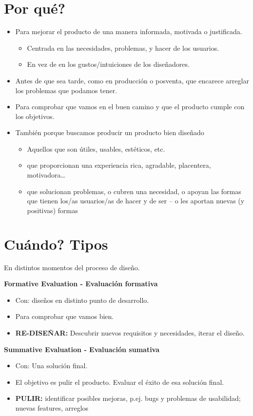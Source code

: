 \documentclass[12pt]{report} %
\begin{document}
\section{Por qué?}
\begin{itemize}
  \item Para mejorar el producto de una manera informada, motivada o justificada.
  \begin{itemize}
    \item Centrada en las necesidades, problemas, y hacer de los usuarios.
    \item En vez de en los gustos/intuiciones de los diseñadores.
  \end{itemize}
  \item Antes de que sea tarde, como en producción o posventa, que encarece arreglar los problemas que podamos tener.
  \item Para comprobar que vamos en el buen camino y que el producto cumple con los objetivos.
  \item También porque buscamos producir un producto bien diseñado
  \begin{itemize}
    \item Aquellos que son útiles, usables, estéticos, etc.
    \item que proporcionan una experiencia rica, agradable, placentera, motivadora\dots
    \item que solucionan problemas, o cubren una necesidad, o apoyan las formas que tienen los/as usuarios/as de hacer y de ser – o les aportan nuevas (y positivas) formas
  \end{itemize}
\end{itemize}

\section{Cuándo? Tipos}
En distintos momentos del proceso de diseño.

\textbf{Formative Evaluation - Evaluación formativa}
\begin{itemize}
  \item Con: diseños en distinto punto de desarrollo.
  \item Para comprobar que vamos bien.
  \item \textbf{RE-DISEÑAR:} Descubrir nuevos requisitos y necesidades, iterar el diseño.
\end{itemize}

\textbf{Summative Evaluation - Evaluación sumativa}
\begin{itemize}
  \item Con: Una solución final.
  \item El objetivo es pulir el producto. Evaluar el éxito de esa solución final.
  \item \textbf{PULIR:} identificar posibles mejoras, p.ej. bugs y problemas de usabilidad; nuevas features, arreglos
\end{itemize}
  
\end{document}
